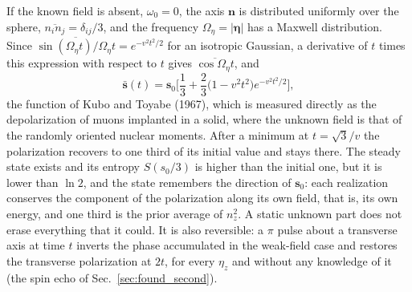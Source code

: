 \documentclass[10pt,a4paper]{article}
\begin{document}
If the known field is absent, $ \omega_0 = 0 $, the axis $ \mathbf{n} $ is distributed uniformly over the sphere, $ \overline{n_in_j} = \delta_{ij}/3 $, and the frequency $ \Omega_\eta = |\boldsymbol{\eta}| $ has a Maxwell distribution.
Since $ \overline{\sin(\Omega_\eta t)/\Omega_\eta t} = e^{-v^{2}t^{2}/2} $ for an isotropic Gaussian, a derivative of $ t $ times this expression with respect to $ t $ gives $ \overline{\cos\Omega_\eta t} $, and
\[
  \bar{\mathbf{s}}(t) = \mathbf{s}_0\Big[\frac13
  + \frac23\Big(1 - v^{2}t^{2}\Big)e^{-v^{2}t^{2}/2}\Big] ,
\]
the function of Kubo and Toyabe (1967), which is measured directly as the depolarization of muons implanted in a solid, where the unknown field is that of the randomly oriented nuclear moments.
After a minimum at $ t = \sqrt3/v $ the polarization recovers to one third of its initial value and stays there.
The steady state exists and its entropy $ S(s_0/3) $ is higher than the initial one, but it is lower than $ \ln2 $, and the state remembers the direction of $ \mathbf{s}_0 $: each realization conserves the component of the polarization along its own field, that is, its own energy, and one third is the prior average of $ n_z^{2} $.
A static unknown part does not erase everything that it could.
It is also reversible: a $ \pi $ pulse about a transverse axis at time $ t $ inverts the phase accumulated in the weak-field case and restores the transverse polarization at $ 2t $, for every $ \eta_z $ and without any knowledge of it (the spin echo of Sec.~\ref{sec:found_second}).
\end{document}

